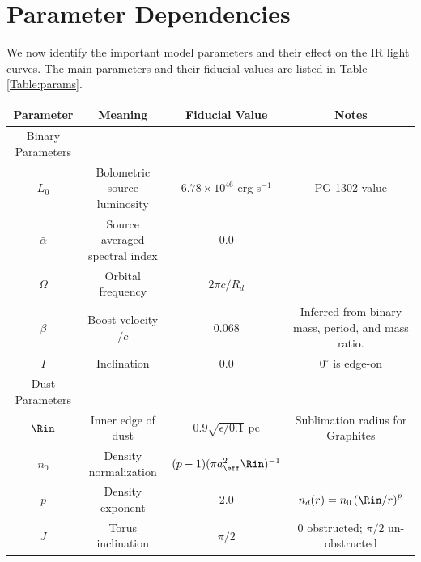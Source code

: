 \section{Parameter Dependencies}
\label{S:PDs}

We now identify the important model parameters and their effect on the IR
light curves. The main parameters and their fiducial values are listed in
Table \ref{Table:params}.
%
\begin{table}
\begin{center}
\begin{tabular}{ c | c | c | c}
        Parameter         & Meaning     & Fiducial Value   &   Notes \\
                   \hline 
                  Binary Parameters &  & \\
                  \hline	
$L_0$				 & Bolometric source luminosity            & $6.78\times10^{46}$  erg s$^{-1}$	  & PG 1302 value\\
$\bar{\alpha}$                     &Source averaged spectral index     &  0.0  & \\
$\Omega$                          & Orbital frequency     			 & $2 \pi c/R_d $     & \\
$\beta$				 & Boost velocity$/c$  			& $0.068$   & Inferred from binary mass, period, and mass ratio. \\
$I$                                      & Inclination           				&  $0.0$  & $0^{\circ}$ is edge-on \\%
                   \hline 	
                  Dust Parameters &  & \\
                  \hline	
$\Rin$               &  Inner edge of dust       								& $0.9 \sqrt{\epsilon/0.1}$ pc		& Sublimation radius for Graphites\\
{$n_0$}            &  Density normalization 								& $(p-1) (\pi a^2_{\eff} \Rin)^{-1}$	&		\\
{$p$}                &  Density exponent       								& 2.0 						&	$n_d(r) = n_0 \left( \Rin/r \right)^{p}$	\\
{$J$}                &  Torus inclination          								& $\pi/2$						&	0 obstructed; $\pi/2$ un-obstructed	\\

\end{tabular}
\end{center}
\end{table}

